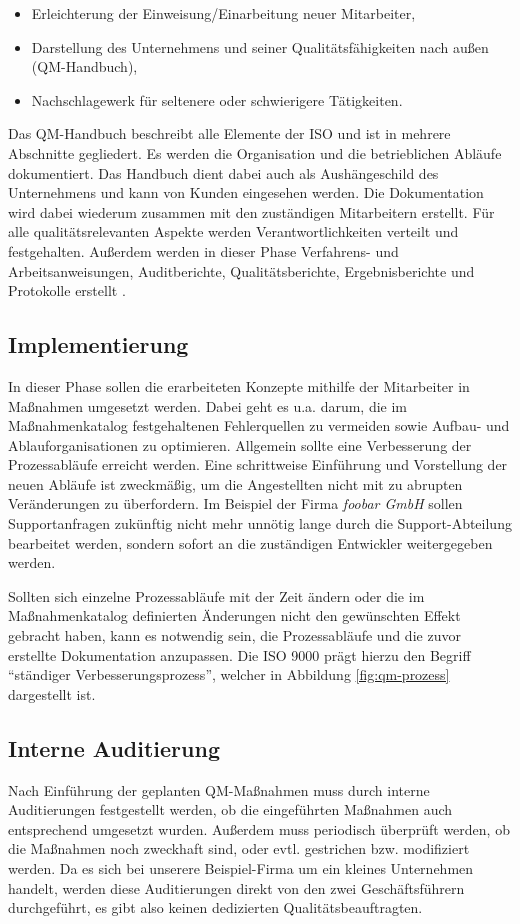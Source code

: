 \begin{itemize}
  \item Erleichterung der Einweisung/Einarbeitung neuer Mitarbeiter,
  \item Darstellung des Unternehmens und seiner Qualitätsfähigkeiten nach außen 
  (QM-Handbuch),
  \item Nachschlagewerk für seltenere oder schwierigere Tätigkeiten.
\end{itemize}

Das QM-Handbuch beschreibt alle Elemente der ISO und ist in mehrere Abschnitte 
gegliedert. Es werden die Organisation und die betrieblichen Abläufe 
dokumentiert. Das Handbuch dient dabei auch als Aushängeschild des Unternehmens 
und kann von Kunden eingesehen werden. Die Dokumentation wird dabei wiederum 
zusammen mit den zuständigen Mitarbeitern erstellt. Für alle 
qualitätsrelevanten Aspekte werden Verantwortlichkeiten verteilt und 
festgehalten. Außerdem werden in dieser Phase Verfahrens- und 
Arbeitsanweisungen, Auditberichte, Qualitätsberichte, Ergebnisberichte und 
Protokolle erstellt \citep{quas}.

\subsection{Implementierung}
In dieser Phase sollen die erarbeiteten Konzepte mithilfe der Mitarbeiter in 
Maßnahmen umgesetzt werden. Dabei geht es u.a. darum, die im Maßnahmenkatalog 
festgehaltenen Fehlerquellen zu vermeiden sowie Aufbau- und 
Ablauforganisationen zu optimieren. Allgemein sollte eine Verbesserung der 
Prozessabläufe erreicht werden. Eine schrittweise Einführung und Vorstellung der
neuen Abläufe ist zweckmäßig, um die Angestellten nicht mit zu abrupten
Veränderungen zu überfordern. Im Beispiel der Firma \emph{foobar GmbH} sollen
Supportanfragen zukünftig nicht mehr unnötig lange durch die Support-Abteilung
bearbeitet werden, sondern sofort an die zuständigen Entwickler weitergegeben
werden. 

Sollten sich einzelne Prozessabläufe mit der Zeit ändern oder die im 
Maßnahmenkatalog definierten Änderungen nicht den gewünschten Effekt gebracht 
haben, kann es notwendig sein, die Prozessabläufe und die zuvor erstellte 
Dokumentation anzupassen. Die ISO 9000 prägt hierzu den Begriff "`ständiger 
Verbesserungsprozess"', welcher in Abbildung \ref{fig:qm-prozess} dargestellt 
ist.

\subsection{Interne Auditierung}
Nach Einführung der geplanten QM-Maßnahmen muss durch interne Auditierungen
festgestellt werden, ob die eingeführten Maßnahmen auch entsprechend umgesetzt
wurden. Außerdem muss periodisch überprüft werden, ob die Maßnahmen noch
zweckhaft sind, oder evtl. gestrichen bzw. modifiziert werden. Da es sich bei
unserere Beispiel-Firma um ein kleines Unternehmen handelt, werden diese
Auditierungen direkt von den zwei Geschäftsführern durchgeführt, es gibt also
keinen dedizierten Qualitätsbeauftragten.

